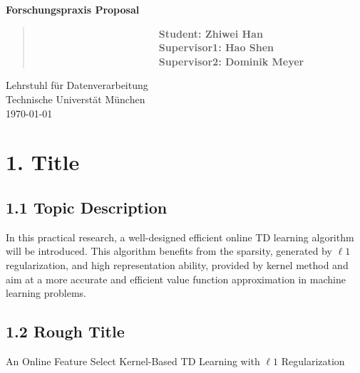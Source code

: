 \documentclass[12pt,a4paper,titlepage]{article}
\begin{document}
\begin{titlepage}
    \begin{center}
        \vspace*{3.5cm}
        
        \textbf{\huge{Forschungspraxis Proposal}}
        
        \vspace{8cm}

        \begin{verse}
            \ \ \ \ \ \ \ \ \ \ \ \ \ \ \ \ \ \ \ \ \ \ \ \ \ \textbf{\large{Student: Zhiwei Han}}\\
            \ \ \ \ \ \ \ \ \ \ \ \ \ \ \ \ \ \ \ \ \ \ \ \ \ \textbf{\large{Supervisor1: Hao Shen}}\\
            \ \ \ \ \ \ \ \ \ \ \ \ \ \ \ \ \ \ \ \ \ \ \ \ \ \textbf{\large{Supervisor2: Dominik Meyer}}\\
        \end{verse}


        
        \vspace{1cm}
        
        
        Lehrstuhl f\"ur Datenverarbeitung\\
        Technische Universt\"at M\"unchen\\
        \today
        
    \end{center}
\end{titlepage}



\setlength{\parindent}{0pt} \setlength{\parskip}{2ex plus 0.5ex
minus 0.2ex}


\section*{1. Title}
\subsection*{1.1 Topic Description}
In this practical research, a well-designed efficient online TD learning algorithm will be introduced. This algorithm benefits from the sparsity, generated by $\ell1$ regularization, and high representation ability, provided by kernel method and aim at a more accurate and efficient value function approximation in machine learning problems.
\subsection*{1.2 Rough Title}
An Online Feature Select Kernel-Based TD Learning with $\ell1$ Regularization
\end{document}
